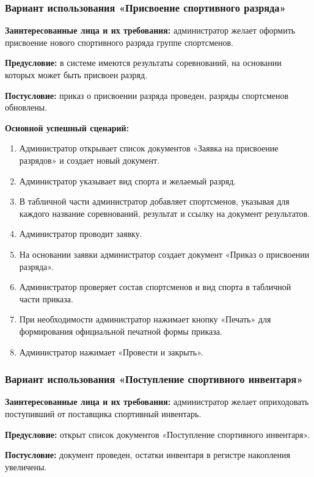 \subsubsection{Вариант использования «Присвоение спортивного разряда»}

\textbf{Заинтересованные лица и их требования:} администратор желает оформить присвоение нового спортивного разряда группе спортсменов.

\textbf{Предусловие:} в системе имеются результаты соревнований, на основании которых может быть присвоен разряд.

\textbf{Постусловие:} приказ о присвоении разряда проведен, разряды спортсменов обновлены.

\textbf{Основной успешный сценарий:}

\begin{enumerate}
	\item Администратор открывает список документов «Заявка на присвоение разрядов» и создает новый документ.
	\item Администратор указывает вид спорта и желаемый разряд.
	\item В табличной части администратор добавляет спортсменов, указывая для каждого название соревнований, результат и ссылку на документ результатов.
	\item Администратор проводит заявку.
	\item На основании заявки администратор создает документ «Приказ о присвоении разряда».
	\item Администратор проверяет состав спортсменов и вид спорта в табличной части приказа.
	\item При необходимости администратор нажимает кнопку «Печать» для формирования официальной печатной формы приказа.
	\item Администратор нажимает «Провести и закрыть».
\end{enumerate}

\subsubsection{Вариант использования «Поступление спортивного инвентаря»}

\textbf{Заинтересованные лица и их требования:} администратор желает оприходовать поступивший от поставщика спортивный инвентарь.

\textbf{Предусловие:} открыт список документов «Поступление спортивного инвентаря».

\textbf{Постусловие:} документ проведен, остатки инвентаря в регистре накопления увеличены.


